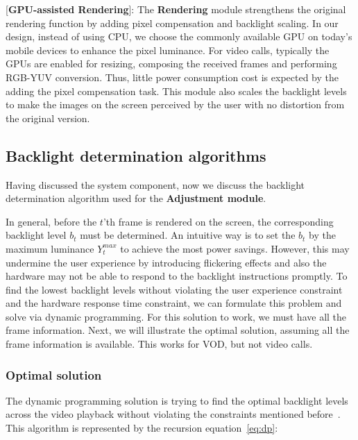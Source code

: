 [{\bf GPU-assisted Rendering}]:
The {\bf Rendering} module strengthens the original rendering function by
adding pixel compensation and backlight scaling.  In our design,
instead of using CPU, we choose the commonly available GPU on today's
mobile devices to enhance the pixel luminance.  For video calls,
typically the GPUs are enabled for resizing, composing the received
frames and performing RGB-YUV conversion. Thus,  little power consumption
cost is expected by the adding the pixel compensation task. This
module also scales the backlight levels to make the images on the
screen perceived by the user with no distortion from the original
version.

\subsection{Backlight determination algorithms}
Having discussed the system component, now we discuss the backlight
determination algorithm used for the {\bf Adjustment module}.

In general, before the $t$'th frame is rendered on the screen, the corresponding
backlight level $b_t$ must be determined. An intuitive way is to set
the $b_t$ by the maximum luminance $Y_{t}^{max}$ to achieve the most
power savings. However, this may undermine the user experience by
introducing flickering effects and also the hardware may not be able
to respond to the backlight instructions promptly.  To find the lowest
backlight levels without violating the user experience constraint and
the hardware response time constraint, we can formulate this problem
and solve via dynamic programming.  For this solution to work, we
must have all the frame information.
Next, we will illustrate the optimal solution, assuming all the frame
information is available. This works for VOD, but not video calls. 


\subsubsection{Optimal solution}
The dynamic programming solution is trying to find the optimal
backlight levels across the video playback without violating the
constraints mentioned before~\cite{CAD}. 
This algorithm is represented by the
recursion equation~\ref{eq:dp}:

